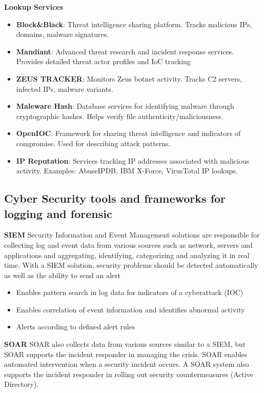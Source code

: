\textbf{Lookup Services}
\begin{itemize}
  \item \textbf{Block\&Black}: Threat intelligence sharing platform. Tracks malicious IPs, domains, malware signatures.
  \item \textbf{Mandiant}: Advanced threat research and incident response services. Provides detailed threat actor profiles and IoC tracking
  \item \textbf{ZEUS TRACKER}: Monitors Zeus botnet activity. Tracks C2 servers, infected IPs, malware variants.
  \item \textbf{Maleware Hash}: Database services for identifying malware through cryptographic hashes. Helps verify file authenticity/maliciousness.
  \item \textbf{OpenIOC}: Framework for sharing threat intelligence and indicators of compromise. Used for describing attack patterns.
  \item \textbf{IP Reputation}: Services tracking IP addresses associated with malicious activity. Examples: AbuseIPDB, IBM X-Force, VirusTotal IP lookups.
\end{itemize}

\subsection{Cyber Security tools and frameworks for logging and forensic}
\textbf{SIEM}
Security Information and Event Management solutions are responsible for collecting log and event data from various sources such as network, servers and applications and aggregating, identifying, categorizing and analyzing it in real time. With a SIEM solution, security problems should be detected automatically as well as the ability to send an alert
\begin{itemize}
  \item Enables pattern search in log data for indicators of a cyberattack (IOC)
  \item Enables correlation of event information and identifies abnormal activity
  \item Alerts according to defined alert rules
\end{itemize}

\textbf{SOAR}
SOAR also collects data from various sources similar to a SIEM, but SOAR supports the incident responder in managing the crisis. SOAR enables automated intervention when a security incident occurs. A SOAR system also supports the incident responder in rolling out security countermeasures (Active Directory).

